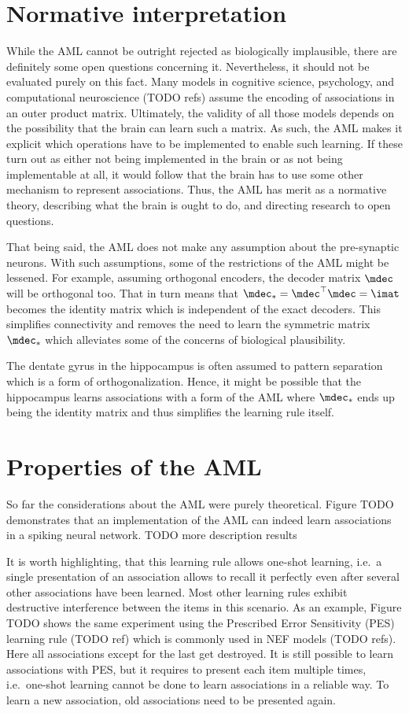 \section{Normative interpretation}
While the AML cannot be outright rejected as biologically implausible, there are definitely some open questions concerning it.
Nevertheless, it should not be evaluated purely on this fact.
Many models in cognitive science, psychology, and computational neuroscience (TODO refs) assume the encoding of associations in an outer product matrix.
Ultimately, the validity of all those models depends on the possibility that the brain can learn such a matrix.
As such, the AML makes it explicit which operations have to be implemented to enable such learning.
If these turn out as either not being implemented in the brain or as not being implementable at all, it would follow that the brain has to use some other mechanism to represent associations.
Thus, the AML has merit as a normative theory, describing what the brain is ought to do, and directing research to open questions.

That being said, the AML does not make any assumption about the pre-synaptic neurons.
With such assumptions, some of the restrictions of the AML might be lessened.
For example, assuming orthogonal encoders, the decoder matrix $\mdec$ will be orthogonal too.
That in turn means that $\mdec_* = \mdec\Tr \mdec = \imat$ becomes the identity matrix which is independent of the exact decoders.
This simplifies connectivity and removes the need to learn the symmetric matrix $\mdec_*$ which alleviates some of the concerns of biological plausibility.

The dentate gyrus in the hippocampus is often assumed to pattern separation which is a form of orthogonalization.
Hence, it might be possible that the hippocampus learns associations with a form of the AML where $\mdec_*$ ends up being the identity matrix and thus simplifies the learning rule itself.


\section{Properties of the AML}
So far the considerations about the AML were purely theoretical.
Figure TODO demonstrates that an implementation of the AML can indeed learn associations in a spiking neural network.
TODO more description results

It is worth highlighting, that this learning rule allows one-shot learning, i.e.\ a single presentation of an association allows to recall it perfectly even after several other associations have been learned.
Most other learning rules exhibit destructive interference between the items in this scenario.
As an example, Figure TODO shows the same experiment using the Prescribed Error Sensitivity (PES) learning rule (TODO ref) which is commonly used in NEF models (TODO refs).
Here all associations except for the last get destroyed.
It is still possible to learn associations with PES, but it requires to present each item multiple times, i.e.\ one-shot learning cannot be done to learn associations in a reliable way.
To learn a new association, old associations need to be presented again.

